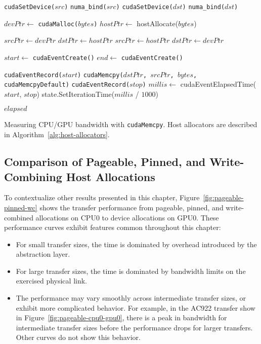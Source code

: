 \begin{algorithm}[H]
	\begin{algorithmic}[1]
		\Statex
		\State \texttt{cudaSetDevice($src$)}
		\Else {}
		\State \texttt{numa\_bind($src$)}
		\EndIf
		\State \texttt{cudaSetDevice($dst$)}
		\Else {}
		\State \texttt{numa\_bind($dst$)}
		\EndIf
		
		\State $devPtr \gets$ \texttt{cudaMalloc($bytes$)} 
		\State $hostPtr \gets$ hostAllocate($bytes$) 

		\State $srcPtr \gets devPtr$
		\State $dstPtr \gets hostPtr$
		\Else {}
		\State $srcPtr \gets hostPtr$
		\State $dstPtr \gets devPtr$
		\EndIf

		\State $start \gets$ \texttt{cudaEventCreate()}
		\State $end \gets$ \texttt{cudaEventCreate()}

		\State \texttt{cudaEventRecord($start$)}
		\State \texttt{cudaMemcpy($dstPtr$, $srcPtr$, $bytes$, cudaMemcpyDefault)}
		\State \texttt{cudaEventRecord($stop$)}
		\State $millis \gets$ cudaEventElapsedTime($start$, $stop$)
		\State state.SetIterationTime($millis$ / $1000$)
        \EndFor
		
		\Return $elapsed$
		\EndFunction
		
	\end{algorithmic}
	\caption[Measuring CPU/GPU bandwidth with \texttt{cudaMemcpy}.]{
		Measuring CPU/GPU bandwidth with \texttt{cudaMemcpy}.
		Host allocators are described in Algorithm~\ref{alg:host-allocators}.
	}
	\label{alg:explicit-cpu-gpu}
\end{algorithm}

\subsection{Comparison of Pageable, Pinned, and Write-Combining Host Allocations}
\label{sec:explicit-pageable-pinned-wc}

To contextualize other results presented in this chapter, Figure~\ref{fig:pageable-pinned-wc} shows the transfer performance from pageable, pinned, and write-combined allocations on CPU0 to device allocations on GPU0.
These performance curves exhibit features common throughout this chapter:
\begin{itemize}
	\item For small transfer sizes, the time is dominated by overhead introduced by the abstraction layer.
	\item For large transfer sizes, the time is dominated by bandwidth limits on the exercised physical link.
	\item The performance may vary smoothly across intermediate transfer sizes, or exhibit more complicated behavior.
	For example, in the AC922 transfer show in Figure~\ref{fig:pageable-cpu0-gpu0}, there is a peak in bandwidth for intermediate transfer sizes before the performance drops for larger transfers.
	Other curves do not show this behavior.
\end{itemize}

